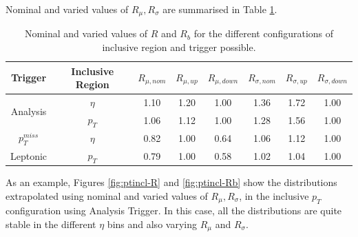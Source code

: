 
Nominal and varied values of $R_\mu, R_\sigma$ are summarised in Table \ref{tab: sumRRupRdown}. 

\begin{table}[H]
    \centering
    \begin{tabular}{|c|c|c|c|c|c|c|c|}
        \hline
        Trigger & Inclusive Region & $R_{\mu, nom}$ & $R_{\mu, up}$  & $R_{\mu, down}$  & $R_{\sigma, nom}$ & $R_{\sigma, up}$  & $R_{\sigma, down}$ \\
        \hline 
      \multirow{2}{*}{Analysis} & $\eta$ & 1.10 & 1.20 &1.00 & 1.36 & 1.72 & 1.00 \\
&  $p_T$& 1.06 & 1.12 & 1.00 & 1.28 & 1.56 & 1.00  \\
  \hline
   $p_T^{miss}$ & $\eta$ & 0.82 & 1.00 & 0.64 & 1.06 & 1.12 & 1.00 \\
  
        \hline
        
       Leptonic & $p_T$ & 0.79 & 1.00 & 0.58 & 1.02 & 1.04 & 1.00 \\
 \hline
    \end{tabular}
    \caption{Nominal and varied values of $R$ and $R_b$ for the different configurations of inclusive region and trigger possible. }
    \label{tab: sumRRupRdown}
\end{table}


As an example, Figures \ref{fig:ptincl-R} and \ref{fig:ptincl-Rb} show the distributions extrapolated using nominal and varied values of $R_\mu, R_\sigma$, in the inclusive $p_T$ configuration using Analysis Trigger. In this case, all the distributions are quite stable in the different $\eta$ bins and also varying $R_\mu$ and $R_\sigma$. 

